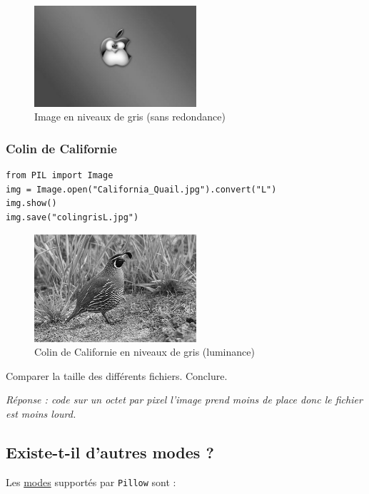 \documentclass[11pt]{article}
\begin{document}
\begin{figure}[htbp]
\centering
\includegraphics[width=6cm]{pommegriseL.jpg}
\caption{Image en niveaux de gris (sans redondance)}
\end{figure}


\subsubsection{Colin de Californie}
\label{sec:orga3e304d}

\begin{verbatim}
from PIL import Image
img = Image.open("California_Quail.jpg").convert("L")
img.show()
img.save("colingrisL.jpg")
\end{verbatim}


\begin{figure}[htbp]
\centering
\includegraphics[width=6cm]{colingrisL.jpg}
\caption{Colin de Californie en niveaux de gris (luminance)}
\end{figure}

Comparer la taille des différents fichiers. Conclure.



\emph{Réponse : code sur un octet par pixel l'image prend moins de place donc le fichier est moins lourd.}

\subsection{Existe-t-il d'autres modes ?}
\label{sec:orgf8ece18}

Les \href{https://pillow.readthedocs.io/en/latest/handbook/concepts.html\#modes}{modes} supportés par \texttt{Pillow} sont : 
\end{document}
